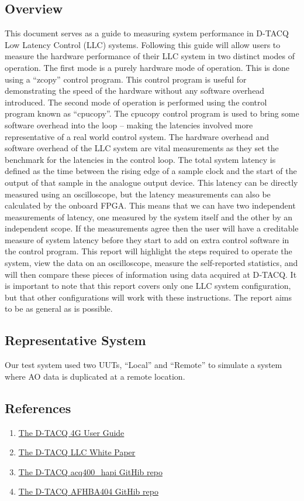 \documentclass{article}
\begin{document}
\subsection{Overview}
This document serves as a guide to measuring system performance in \mbox{D-TACQ} Low Latency Control (LLC) systems.
Following this guide will allow users to  measure the hardware performance of their LLC system in two distinct modes of operation.
The first mode is a purely hardware mode of operation. This is done using a “zcopy” control program.
This control program is useful for demonstrating the speed of the hardware without any software overhead introduced.
The second mode of operation is performed using the control program known as “cpucopy”.
The cpucopy control program is used to bring some software overhead into the loop – making the latencies involved more representative of a real world control system.
The hardware overhead and software overhead of the LLC system are vital measurements as they set the benchmark for the latencies in the control loop.
\newline
The total system latency is defined as the time between the rising edge of a sample clock and the start of the output of that sample in the analogue output device.
This latency can be directly measured using an oscilloscope, but the latency measurements can also be calculated by the onboard FPGA.
This means that we can have two independent measurements of latency, one measured by the system itself and the other by an independent scope.
If the measurements agree then the user will have a creditable measure of system latency before they start to add on extra control software in the control program.
This report will highlight the steps required to operate the system, view the data on an oscilloscope, measure the self-reported statistics, and will then compare these pieces of information using data acquired at D‑TACQ.
\newline
It is important to note that this report covers only one LLC system configuration, but that other configurations will work with these instructions. The report aims to be as general as is possible. 
\subsection{Representative System}
Our test system used two UUTs, “Local” and “Remote” to simulate a system where AO data is duplicated at a remote location.
\subsection{References}
\begin{enumerate}
	\item \href{http://www.d-tacq.com/resources/d-tacq-4G-acq4xx-UserGuide-r28.pdf}{The \mbox{D-TACQ} 4G User Guide}
	\item \href{http://www.d-tacq.com/resources/LLC_White_Paper.pdf}{The \mbox{D-TACQ} LLC White Paper}
	\item \href{https://github.com/D-TACQ/acq400_hapi}{The \mbox{D-TACQ} acq400\_hapi GitHib repo}
	\item \href{https://github.com/D-TACQ/AFHBA404}{The \mbox{D-TACQ} AFHBA404 GitHib repo}
\end{enumerate}
\end{document}
